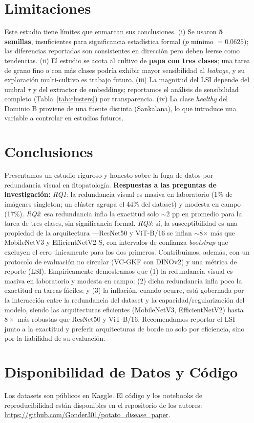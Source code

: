 \documentclass[journal,compsoc]{IEEEtran}
\begin{document}
\section{Limitaciones}
Este estudio tiene límites que enmarcan sus conclusiones. (i) Se usaron \textbf{5 semillas}, insuficientes para significancia estadística formal ($p$ mínimo $=0.0625$); las diferencias reportadas son consistentes en dirección pero deben leerse como tendencias. (ii) El estudio se acota al cultivo de \textbf{papa con tres clases}; una tarea de grano fino o con más clases podría exhibir mayor sensibilidad al \textit{leakage}, y su exploración multi-cultivo es trabajo futuro. (iii) La magnitud del LSI depende del umbral $\tau$ y del extractor de embeddings; reportamos el análisis de sensibilidad completo (Tabla~\ref{tab:clusters}) por transparencia. (iv) La clase \textit{healthy} del Dominio B proviene de una fuente distinta (Sankalana), lo que introduce una variable a controlar en estudios futuros.

\section{Conclusiones}
Presentamos un estudio riguroso y honesto sobre la fuga de datos por redundancia visual en fitopatología. \textbf{Respuestas a las preguntas de investigación:} \textit{RQ1}: la redundancia visual es masiva en laboratorio (1\% de imágenes singleton; un clúster agrupa el 44\% del dataset) y modesta en campo (17\%). \textit{RQ2}: esa redundancia infla la exactitud solo $\sim$2 pp en promedio para la tarea de tres clases, sin significancia formal. \textit{RQ3}: sí, la susceptibilidad es una propiedad de la arquitectura ---ResNet50 y ViT-B/16 se inflan $\sim$8$\times$ más que MobileNetV3 y EfficientNetV2-S, con intervalos de confianza \textit{bootstrap} que excluyen el cero únicamente para los dos primeros. Contribuimos, además, con un protocolo de evaluación no circular (VC-GKF con DINOv2) y una métrica de reporte (LSI). Empíricamente demostramos que (1) la redundancia visual es masiva en laboratorio y modesta en campo; (2) dicha redundancia infla poco la exactitud en tareas fáciles; y (3) la inflación, cuando ocurre, está gobernada por la interacción entre la redundancia del dataset y la capacidad/regularización del modelo, siendo las arquitecturas eficientes (MobileNetV3, EfficientNetV2) hasta $8\times$ más robustas que ResNet50 y ViT-B/16. Recomendamos reportar el LSI junto a la exactitud y preferir arquitecturas de borde no solo por eficiencia, sino por la fiabilidad de su evaluación.

\section*{Disponibilidad de Datos y Código}
Los datasets son públicos en Kaggle. El código y los notebooks de reproducibilidad están disponibles en el repositorio de los autores: \url{https://github.com/Gonder301/potato_disease_paper}.



\end{document}
